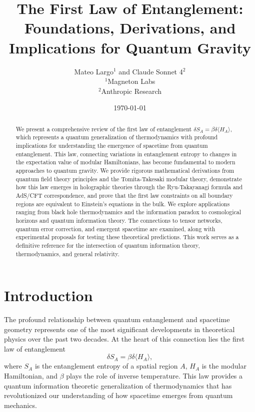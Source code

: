 \documentclass[11pt,letterpaper]{article}
\title{The First Law of Entanglement: Foundations, Derivations, and Implications for Quantum Gravity}
\author{Mateo Largo$^1$ and Claude Sonnet 4$^2$\\
$^1$Magneton Labs\\
$^2$Anthropic Research}
\date{\today}
\begin{document}
\maketitle

\begin{abstract}
We present a comprehensive review of the first law of entanglement $\delta S_A = \beta\delta\langle H_A\rangle$, which represents a quantum generalization of thermodynamics with profound implications for understanding the emergence of spacetime from quantum entanglement. This law, connecting variations in entanglement entropy to changes in the expectation value of modular Hamiltonians, has become fundamental to modern approaches to quantum gravity. We provide rigorous mathematical derivations from quantum field theory principles and the Tomita-Takesaki modular theory, demonstrate how this law emerges in holographic theories through the Ryu-Takayanagi formula and AdS/CFT correspondence, and prove that the first law constraints on all boundary regions are equivalent to Einstein's equations in the bulk. We explore applications ranging from black hole thermodynamics and the information paradox to cosmological horizons and quantum information theory. The connections to tensor networks, quantum error correction, and emergent spacetime are examined, along with experimental proposals for testing these theoretical predictions. This work serves as a definitive reference for the intersection of quantum information theory, thermodynamics, and general relativity.
\end{abstract}

\section{Introduction}

The profound relationship between quantum entanglement and spacetime geometry represents one of the most significant developments in theoretical physics over the past two decades. At the heart of this connection lies the first law of entanglement
\begin{equation}
\delta S_A = \beta\delta\langle H_A\rangle,
\label{eq:first_law}
\end{equation}
where $S_A$ is the entanglement entropy of a spatial region $A$, $H_A$ is the modular Hamiltonian, and $\beta$ plays the role of inverse temperature. This law provides a quantum information theoretic generalization of thermodynamics that has revolutionized our understanding of how spacetime emerges from quantum mechanics.
\end{document}
